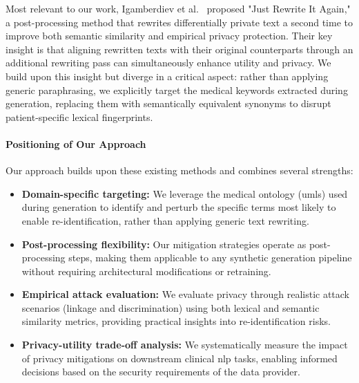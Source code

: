 Most relevant to our work, Igamberdiev et al.~\cite{igamberdiev2024rewriteagain} proposed "Just Rewrite It Again," a post-processing method that rewrites differentially private text a second time to improve both semantic similarity and empirical privacy protection. Their key insight is that aligning rewritten texts with their original counterparts through an additional rewriting pass can simultaneously enhance utility and privacy. We build upon this insight but diverge in a critical aspect: rather than applying generic paraphrasing, we explicitly target the medical keywords extracted during generation, replacing them with semantically equivalent synonyms to disrupt patient-specific lexical fingerprints.

\paragraph{Positioning of Our Approach}

Our approach builds upon these existing methods and combines several strengths:

\begin{itemize}
    \item \textbf{Domain-specific targeting:} We leverage the medical ontology (\gls{umls}) used during generation to identify and perturb the specific terms most likely to enable re-identification, rather than applying generic text rewriting.
    
    \item \textbf{Post-processing flexibility:} Our mitigation strategies operate as post-processing steps, making them applicable to any synthetic generation pipeline without requiring architectural modifications or retraining.
    
    \item \textbf{Empirical attack evaluation:} We evaluate privacy through realistic attack scenarios (linkage and discrimination) using both lexical and semantic similarity metrics, providing practical insights into re-identification risks.
    
    \item \textbf{Privacy-utility trade-off analysis:} We systematically measure the impact of privacy mitigations on downstream clinical \gls{nlp} tasks, enabling informed decisions based on the security requirements of the data provider.
\end{itemize}


